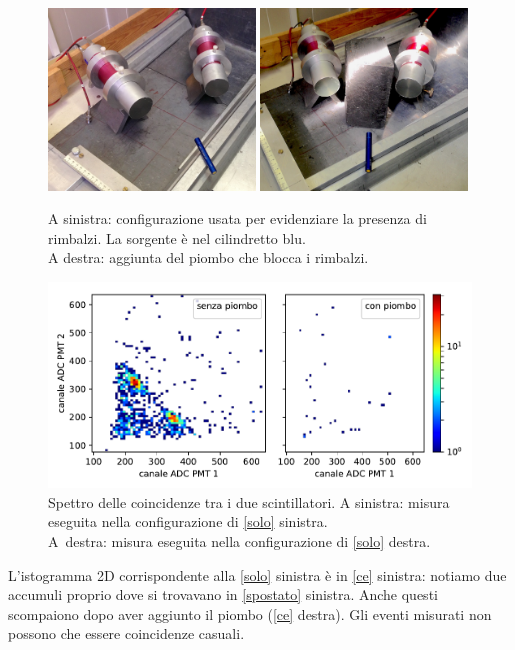 \begin{figure}[h]
\centering
\subfloat
{\includegraphics[width=0.49\textwidth]{immagini/rimb.jpg}}
\hfill
\subfloat
{\includegraphics[width=0.49\textwidth]{immagini/norimb}}
\caption{\label{solo}
A sinistra:
configurazione usata per evidenziare la presenza di rimbalzi.
La sorgente è nel cilindretto blu.\\
A destra:
aggiunta del piombo che blocca i rimbalzi.}
\end{figure}

\begin{figure}[h]
\centering
\includegraphics[width=\textwidth]{immagini/rimb}
\caption{\label{ce}
Spettro delle coincidenze tra i due scintillatori.
A sinistra: misura eseguita nella configurazione di \autoref{solo} sinistra.\\
A~destra: misura eseguita nella configurazione di \autoref{solo} destra.}
\end{figure}

L'istogramma 2D corrispondente alla \autoref{solo} sinistra è in \autoref{ce} sinistra: notiamo due accumuli proprio dove si trovavano in \autoref{spostato} sinistra. Anche questi scompaiono dopo aver aggiunto il piombo (\autoref{ce} destra). Gli eventi misurati non possono che essere coincidenze casuali.


